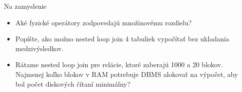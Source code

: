 \documentclass[12pt]{beamer}
\begin{document}
\begin{frame}{Na zamyslenie}
\begin{itemize}
\item Aké fyzické operátory zodpovedajú množinovému rozdielu?
\item Popíšte, ako možno nested loop join 4 tabuliek vypočítať bez ukladania medzivýsledkov.
\item Rátame nested loop join pre relácie, ktoré zaberajú 1000 a 20 blokov.
    Najmenej koľko blokov v RAM potrebuje DBMS alokovať na výpočet, aby bol počet diskových čítaní minimálny?
\end{itemize}
\end{frame}
\end{document}
